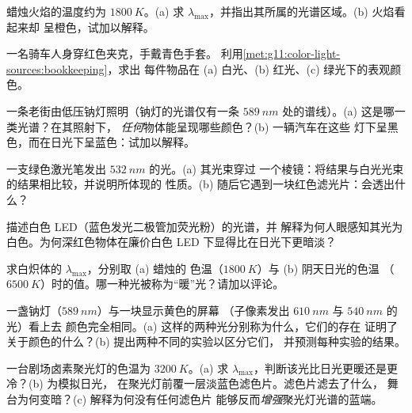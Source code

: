 \begin{exercise}[$\star\star$]\label{exo:g11:color-light-sources:6}
蜡烛火焰的温度约为 $\qty{1800}{K}$。(a) 求
$\lambda_{\max}$，并指出其所属的光谱区域。(b) 火焰看起来却
呈橙色，试加以解释。
\end{exercise}

\begin{exercise}[$\star\star$]\label{exo:g11:color-light-sources:7}
一名骑车人身穿红色夹克，手戴青色手套。
利用\cref{met:g11:color-light-sources:bookkeeping}，求出
每件物品在 (a) 白光、(b) 红光、(c) 绿光下的表观颜色。
\end{exercise}

\begin{exercise}[$\star\star$]\label{exo:g11:color-light-sources:8}
一条老街由低压钠灯照明（钠灯的光谱仅有一条
$\qty{589}{nm}$ 处的谱线）。(a) 这是哪一类光谱？在其照射下，
\emph{任何}物体能呈现哪些颜色？(b) 一辆汽车在这些
灯下呈黑色，而在日光下呈蓝色：试加以解释。
\end{exercise}

\begin{exercise}[$\star\star$]\label{exo:g11:color-light-sources:9}
一支绿色激光笔发出 $\qty{532}{nm}$ 的光。(a) 其光束穿过
一个棱镜：将结果与白光光束的结果相比较，并说明所体现的
性质。(b) 随后它遇到一块红色滤光片：会透出什么？
\end{exercise}

\begin{exercise}[$\star\star$]\label{exo:g11:color-light-sources:10}
描述白色 LED（蓝色发光二极管加荧光粉）的光谱，并
解释为何人眼感知其光为白色。为何深红色物体在廉价白色 LED
下显得比在日光下更暗淡？
\end{exercise}

\begin{exercise}[$\star\star$]\label{exo:g11:color-light-sources:11}
求白炽体的 $\lambda_{\max}$，分别取 (a) 蜡烛的
色温（$\qty{1800}{K}$）与 (b) 阴天日光的色温
（$\qty{6500}{K}$）时的值。哪一种光被称为“暖”光？请加以评论。
\end{exercise}

\begin{exercise}[$\star\star\star$]\label{exo:g11:color-light-sources:12}
一盏钠灯（$\qty{589}{nm}$）与一块显示黄色的屏幕
（子像素发出 $\qty{610}{nm}$ 与 $\qty{540}{nm}$ 的光）看上去
颜色完全相同。(a) 这样的两种光分别称为什么，它们的存在
证明了关于颜色的什么？(b) 提出两种不同的实验以区分它们，
并预测每种实验的结果。
\end{exercise}

\begin{exercise}[$\star\star\star$]\label{exo:g11:color-light-sources:13}
一台剧场卤素聚光灯的色温为 $\qty{3200}{K}$。(a) 求
$\lambda_{\max}$，判断该光比日光更暖还是更冷？(b) 为模拟日光，
在聚光灯前覆一层淡蓝色滤色片。滤色片滤去了什么，
舞台为何变暗？(c) 解释为何没有任何滤色片
能够反而\emph{增强}聚光灯光谱的蓝端。
\end{exercise}

